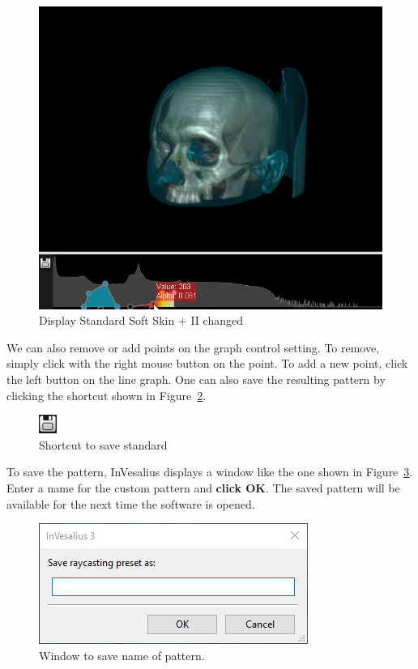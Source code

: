 \begin{figure}[!htb]
\centering
\includegraphics[scale=0.6]{../user_guide_figures/invesalius_screen/customize_2.png}
\caption{Display Standard Soft Skin + II changed}
\label{fig:customize_2}
\end{figure}


\newpage

We can also remove or add points on the graph control setting. To remove, simply click with the right mouse button on the point. To add a new point, click the left button on the line graph. One can also save the resulting pattern by clicking the shortcut shown in Figure~\ref{fig:save_preset}.

\begin{figure}[!htb]
\centering
\includegraphics[scale=0.6]{../user_guide_figures/invesalius_screen/save_preset.png}
\caption{Shortcut to save standard}
\label{fig:save_preset}
\end{figure}
 
To save the pattern, InVesalius displays a window like the one shown in Figure~\ref{fig:save_window_preset}. Enter a name for the custom pattern and \textbf{click OK}. The saved pattern will be available for the next time the software is opened.

\begin{figure}[!htb]
\centering
\includegraphics[scale=0.7]{../user_guide_figures/invesalius_screen/save_window_preset_en.png}
\caption{Window to save name of pattern.}
\label{fig:save_window_preset}
\end{figure}

